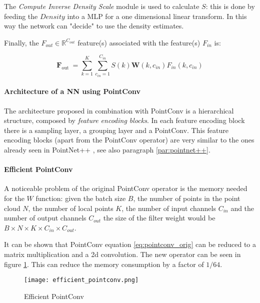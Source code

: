 The \textit{Compute Inverse Density Scale} module is used to calculate $S$: this is done by feeding the $Density$ into a MLP for a one dimensional linear transform. In this way the network can "decide" to use the density estimates.

Finally, the $F_{out} \in \mathbb{R}^{C_{out}}$ feature(s) associated with the feature(s) $F_{in}$ is:

\begin{equation}\label{eq:pointconv_orig}
\mathbf{F}_{\text {out }}=\sum_{k=1}^{K} \sum_{c_{i n}=1}^{C_{i n}} S(k) \mathbf{W}\left(k, c_{i n}\right) F_{i n}\left(k, c_{i n}\right)
\end{equation}

\paragraph{Architecture of a NN using PointConv} The architecture proposed in combination with PointConv is a hierarchical structure, composed by \textit{feature encoding blocks}.
In each feature encoding block there is a sampling layer, a grouping layer and a PointConv.
This feature encoding blocks (apart from the PointConv operator) are very similar to the ones already seen in PointNet++ \cite{qi2017pointnet++}, see also paragraph \ref{par:pointnet++}.

\paragraph{Efficient PointConv} A noticeable problem of the original PointConv operator is the memory needed for the $W$ function: given the batch size $B$, the number of points in the point cloud $N$, the number of local points $K$, the number of input channels $C_{in}$ and the number of output channels $C_{out}$ the size of the filter weight would be $B \times N \times K \times C_{in} \times C_{out}$.

It can be shown that PointConv equation \ref{eq:pointconv_orig} can be reduced to a matrix multiplication and a 2d convolution. The new operator can be seen in figure \ref{fig:efficientPointconv}. This can reduce the memory consumption by a factor of $1 / 64$.

\begin{figure}[ht]
    \centering
    \texttt{[image: efficient\_pointconv.png]}
    \caption{Efficient PointConv}
    \label{fig:efficientPointconv}
\end{figure}

